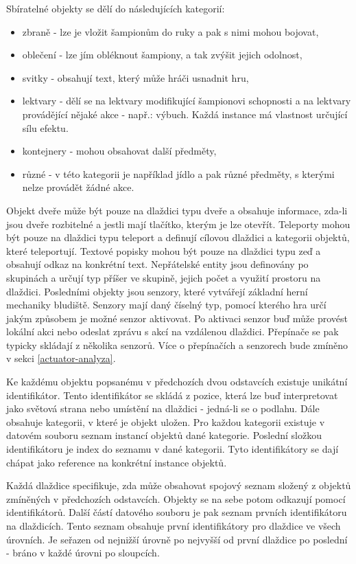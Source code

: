 Sbíratelné objekty se dělí do následujících kategorií:\label{grabable-items}
\begin{itemize}
\item zbraně - lze je vložit šampionům do ruky a pak s nimi mohou bojovat,
\item oblečení - lze jím obléknout šampiony, a tak zvýšit jejich odolnost,
\item svitky - obsahují text, který může hráči usnadnit hru, 
\item lektvary - dělí se na lektvary modifikující šampionovi schopnosti a na lektvary provádějící nějaké
	akce - např.: výbuch. Každá instance má vlastnost určující sílu efektu.
\item kontejnery - mohou obsahovat další předměty,
\item různé - v této kategorii je například jídlo a pak různé předměty, s kterými nelze provádět žádné akce.
\end{itemize}


Objekt dveře může být pouze na dlaždici typu dveře a obsahuje informace, zda-li jsou dveře rozbitelné a jestli 
mají tlačítko, kterým je lze otevřít. Teleporty mohou být pouze na dlaždici typu teleport a 
definují cílovou dlaždici a kategorii objektů, které teleportují. Textové popisky mohou být pouze na 
dlaždici typu zeď a obsahují odkaz na konkrétní text. Nepřátelské entity jsou definovány po skupinách a určují 
typ příšer ve skupině, jejich počet a využití prostoru na dlaždici. Posledními objekty jsou senzory, 
které vytvářejí základní herní mechaniky bludiště. Senzory mají daný číselný typ, pomocí kterého hra 
určí jakým způsobem je možné senzor
aktivovat. Po aktivaci senzor buď může provést lokální akci nebo odeslat zprávu s akcí na vzdálenou 
dlaždici. Přepínače se pak typicky skládají z několika senzorů. Více o přepínačích a senzorech bude zmíněno
v sekci \ref{actuator-analyza}. 

Ke každému objektu popsanému v předchozích dvou odstavcích existuje unikátní identifikátor. 
Tento identifikátor se skládá z pozice, která lze buď interpretovat jako světová strana nebo 
umístění na dlaždici - jedná-li se o podlahu. Dále obsahuje kategorii, v které je objekt
uložen. Pro každou kategorii existuje
v datovém souboru seznam instancí objektů dané kategorie. Poslední složkou identifikátoru 
je index do seznamu v dané kategorii. Tyto identifikátory se dají chápat jako reference 
na konkrétní instance objektů.

Každá dlaždice specifikuje, zda může obsahovat spojový seznam složený z objektů zmíněných v předchozích odstavcích. 
Objekty se na sebe potom odkazují pomocí identifikátorů. Další částí datového souboru je pak 
seznam prvních identifikátoru na dlaždicích. Tento seznam obsahuje první identifikátory pro dlaždice
ve všech úrovních. Je seřazen od nejnižší úrovně po nejvyšší od první dlaždice po poslední - bráno  
v každé úrovni po sloupcích.

